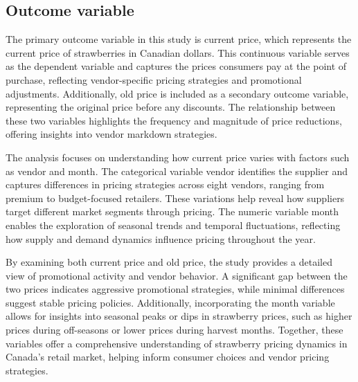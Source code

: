 \documentclass[
  letterpaper,
  DIV=11,
  numbers=noendperiod]{scrartcl}
\begin{document}
\subsection{Outcome variable}\label{outcome-variable}

The primary outcome variable in this study is current price, which
represents the current price of strawberries in Canadian dollars. This
continuous variable serves as the dependent variable and captures the
prices consumers pay at the point of purchase, reflecting
vendor-specific pricing strategies and promotional adjustments.
Additionally, old price is included as a secondary outcome variable,
representing the original price before any discounts. The relationship
between these two variables highlights the frequency and magnitude of
price reductions, offering insights into vendor markdown strategies.

The analysis focuses on understanding how current price varies with
factors such as vendor and month. The categorical variable vendor
identifies the supplier and captures differences in pricing strategies
across eight vendors, ranging from premium to budget-focused retailers.
These variations help reveal how suppliers target different market
segments through pricing. The numeric variable month enables the
exploration of seasonal trends and temporal fluctuations, reflecting how
supply and demand dynamics influence pricing throughout the year.

By examining both current price and old price, the study provides a
detailed view of promotional activity and vendor behavior. A significant
gap between the two prices indicates aggressive promotional strategies,
while minimal differences suggest stable pricing policies. Additionally,
incorporating the month variable allows for insights into seasonal peaks
or dips in strawberry prices, such as higher prices during off-seasons
or lower prices during harvest months. Together, these variables offer a
comprehensive understanding of strawberry pricing dynamics in Canada's
retail market, helping inform consumer choices and vendor pricing
strategies.
\end{document}
